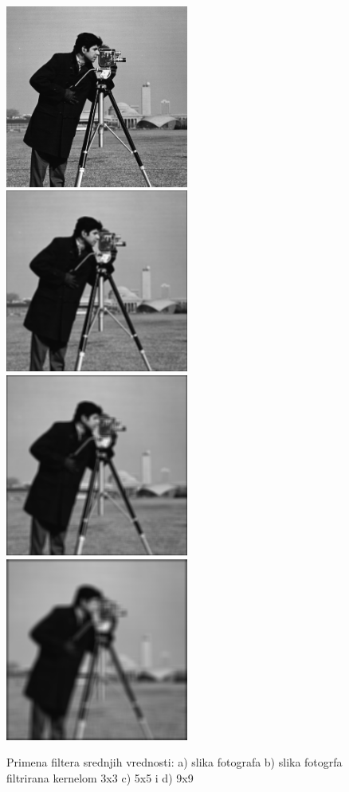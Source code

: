 \documentclass[a4paper,12pt,titlepage]{article}
\begin{document}
\begin{figure}[ht!]
\centering
\includegraphics[width=60mm]{img/img.png}
\includegraphics[width=60mm]{img/imgAvg3.png}
\includegraphics[width=60mm]{img/imgAvg5.png}
\includegraphics[width=60mm]{img/imgAvg9.png}
\caption{Primena filtera srednjih vrednosti: a) slika fotografa b) slika fotogrfa filtrirana kernelom 3x3 c) 5x5 i d) 9x9}
\label{averageFilter}
\end{figure}
\end{document}
